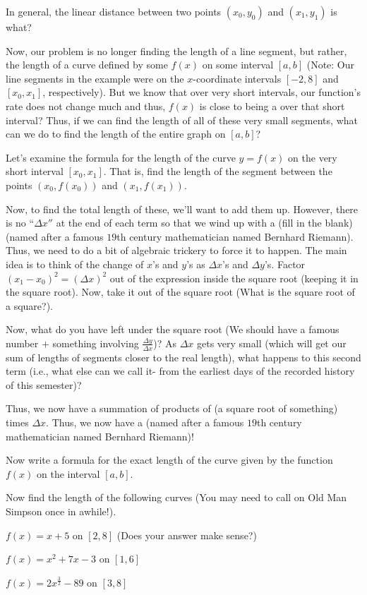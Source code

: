 \documentclass{ximera}
\begin{document}
In general, the linear distance between two points $(x_0, y_0)$ and  $(x_1, y_1)$ is what?

Now, our problem is no longer finding the length of a line segment, but rather, the length of a curve defined by some $f(x)$  on some interval $[a, b]$ (Note:  Our line segments in the example were on the $x$-coordinate intervals $[-2, 8]$ and  $[x_0, x_1]$, respectively).  But we know that over very short intervals, our function's rate does not change much and thus, $f(x)$ is close to being a \underline{\hspace{0.5in}} over that short interval?  Thus, if we can find the length of all of these very small segments, what can we do to find the length of the entire graph on $[a, b]$?  

Let's examine the formula for the length of the curve $y=f(x)$ on the very short interval  $[x_0, x_1]$.  That is, find the length of the segment between the points $(x_0, f(x_0))$ and  $(x_1, f(x_1))$.

Now, to find the total length of these, we'll want to add them up.  However, there is no ``$\Delta x''$  at the end of each term so that we wind up with a (fill in the blank) \underline{\hspace{ 0.5in}} (named after a famous $19$th century mathematician named Bernhard Riemann).  Thus, we need to do a bit of algebraic trickery to force it to happen.  The main idea is to think of the change of $x$'s and $y$'s as  $\Delta x$'s and  $\Delta y$'s.  Factor $(x_1-x_0)^2=(\Delta x)^2$ out of the expression inside the square root (keeping it in the square root).  Now, take it out of the square root (What is the square root of a square?).  

Now, what do you have left under the square root (We should have a famous number $+$ something involving  $\frac{\Delta y}{\Delta x}$)?  As $\Delta x$ gets very small (which will get our sum of lengths of segments closer to the real length), what happens to this second term (i.e., what else can we call it- from the earliest days of the recorded history of this semester)?

Thus, we now have a summation of products of (a square root of something) times  $\Delta x$.  Thus, we now have a \underline{\hspace{0.5in}} (named after a famous $19$th century mathematician named Bernhard Riemann)!

Now write a formula for the exact length of the curve given by the function $f(x)$ on the interval $[a, b]$.

Now find the length of the following curves (You may need to call on Old Man Simpson once in awhile!).

\begin{problem} 
$f(x) = x+5$ on $[2, 8]$ (Does your answer make sense?)
\end{problem}
\begin{problem} 
$f(x) = x^2+7x-3$ on $[1, 6]$
\end{problem}
\begin{problem} 
$f(x) = 2x^{\frac{3}{2}}-89$ on $[3, 8]$
\end{problem}
\end{document}
